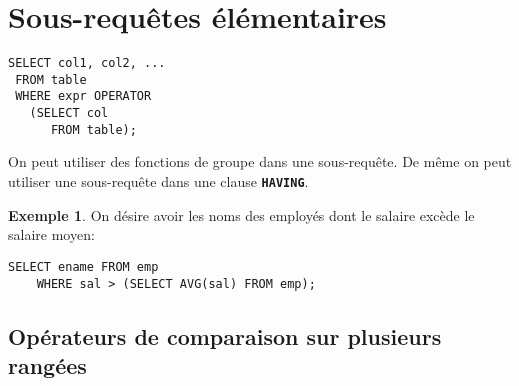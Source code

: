 \documentclass[a4paper, 12pt]{report}
\newcommand{\textSQL}[1]{\texttt{\textbf{#1}}}
\theoremstyle{definition} \newtheorem{ex}{Exemple}
\begin{document}
\section{Sous-requêtes élémentaires}
\begin{lstlisting}[frame=single]
SELECT col1, col2, ...
 FROM table
 WHERE expr OPERATOR
   (SELECT col
	  FROM table);
\end{lstlisting}

On peut utiliser des fonctions de groupe dans une sous-requête. De même on peut utiliser une sous-requête dans une clause \textSQL{HAVING}.
\begin{ex}
	On désire avoir les noms des employés dont le salaire excède le salaire moyen:
	\begin{lstlisting}[frame=single]
SELECT ename FROM emp
	WHERE sal > (SELECT AVG(sal) FROM emp);
	\end{lstlisting}
\end{ex}

\subsection*{Opérateurs de comparaison sur plusieurs rangées}
\end{document}
